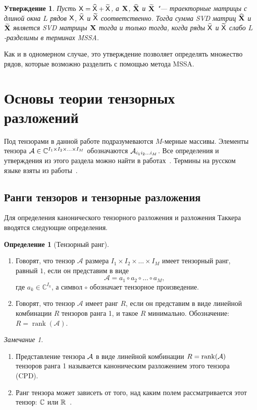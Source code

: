 \documentclass[specialist,
  substylefile=spbu.rtx,
subf,href,colorlinks=true, 12pt]{disser}
\theoremstyle{plain}
\newtheorem{statement}{Утверждение}[section]
\theoremstyle{definition}
\newtheorem{definition}{Определение}[section]
\theoremstyle{remark}
\newtheorem*{remark}{Замечание}
\begin{document}
\begin{statement}
  \label{state:mssa-separability}
  Пусть $\mathsf{X} = \widehat{\mathsf{X}} + \widetilde{\mathsf{X}}$, а $\mathbf{X}$, $\widehat{\mathbf{X}}$ и $\widetilde{\mathbf{X}}$ "--- траекторные
  матрицы с длиной окна $L$ рядов $\mathsf{X}$, $\widehat{\mathsf{X}}$ и $\widetilde{\mathsf{X}}$ соответственно.
  Тогда сумма \emph{SVD} матриц $\widehat{\mathbf{X}}$ и $\widetilde{\mathbf{X}}$ является \emph{SVD} матрицы $\mathbf{X}$ тогда и только тогда, когда
  ряды $\widehat{\mathsf{X}}$ и $\widetilde{\mathsf{X}}$ слабо $L$-разделимы в терминах MSSA.
\end{statement}
Как и в одномерном случае, это утверждение позволяет определять множество рядов, которые возможно разделить с
помощью метода MSSA.


\section{Основы теории тензорных разложений}\label{sec:tensor-decompositions}
Под тензорами в данной работе подразумеваются $M$-мерные массивы.
Элементы тензора $\mathcal{A} \in \mathbb{C}^{I_1 \times I_2 \times \ldots \times I_M}$ обозначаются
$\mathcal{A}_{i_1 i_2 \ldots i_M}$.
Все определения и утверждения из этого раздела можно найти в
работах~\cite{hosvd, tensor-bg, tensor-bg2, tensor-bg3}.
Термины на русском языке взяты из работы~\cite{tensor-rus}.


\subsection{Ранги тензоров и тензорные разложения}\label{subsec:tensor-ranks}
Для определения канонического тензорного разложения и разложения Таккера вводятся следующие определения.
\begin{definition}[Тензорный ранг]
  \leavevmode
  \begin{enumerate}
    \item Говорят, что тензор $\mathcal{A}$ размера $I_1\times I_2\times \ldots \times I_M$ имеет тензорный ранг, равный $1$, если он представим в виде
      \[
        \mathcal{A}=a_1\circ a_2\circ \ldots \circ a_M,
      \]
      где $a_{k} \in \mathbb{C}^{I_k}$, а символ $\circ$ обозначает тензорное произведение.
    \item Говорят, что тензор $\mathcal{A}$ имеет ранг $R$, если он представим в виде линейной комбинации $R$ тензоров
      ранга 1, и такое $R$ минимально.
      Обозначение: $R=\operatorname{rank}(\mathcal{A})$.
  \end{enumerate}
\end{definition}
\begin{remark}
  \begin{enumerate}
    \item Представление тензора $\mathcal{A}$ в виде линейной комбинации $R = \operatorname{rank}(\mathcal{A})$ тензоров ранга 1 называется каноническим разложением этого тензора (CPD).
    \item Ранг тензора может зависеть от того, над каким полем рассматривается этот тензор:
      $\mathbb{C}$ или $\mathbb{R}$~\cite{tensor-bg}.
  \end{enumerate}
\end{remark}
\end{document}
